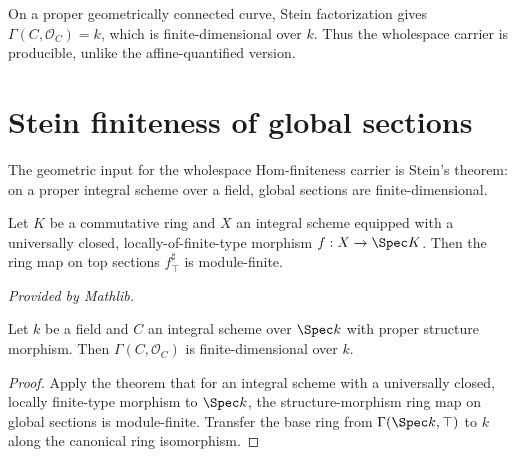 \begin{remark}
  On a proper geometrically connected curve, Stein factorization gives \(\Gamma(C, \mathcal O_C) = k\), which is finite-dimensional over \(k\). Thus the wholespace carrier is producible, unlike the affine-quantified version.
\end{remark}

\section{Stein finiteness of global sections}
\label{sec:module_finite_globalSections_iter044}

The geometric input for the wholespace Hom-finiteness carrier is Stein's theorem: on a proper integral scheme over a field, global sections are finite-dimensional.

\begin{theorem}
  \label{thm:finite_appTop_of_universallyClosed}

  Let \(K\) be a commutative ring and \(X\) an integral scheme equipped with a
  universally closed, locally-of-finite-type morphism \(f : X \to \Spec K\).
  Then the ring map on top sections \(f^\sharp_{\top}\) is module-finite.

  \textit{Provided by Mathlib.}
\end{theorem}

\begin{theorem}
  \label{thm:Scheme_module_finite_globalSections_of_isProper}

  Let \(k\) be a field and \(C\) an integral scheme over \(\Spec k\) with proper structure morphism. Then \(\Gamma(C, \mathcal O_C)\) is finite-dimensional over \(k\).
\end{theorem}

\begin{proof}
  
  \leanok
  Apply the theorem that for an integral scheme with a universally closed, locally finite-type morphism to \(\Spec k\), the structure-morphism ring map on global sections is module-finite. Transfer the base ring from \(\Gamma(\Spec k, \top)\) to \(k\) along the canonical ring isomorphism.
\end{proof}

